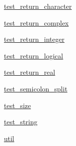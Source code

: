 \begin{DoxyCompactItemize}
 \hyperlink{namespacenumpy_1_1f2py_1_1tests_1_1test__return__character}{test\+\_\+return\+\_\+character}
\item 
 \hyperlink{namespacenumpy_1_1f2py_1_1tests_1_1test__return__complex}{test\+\_\+return\+\_\+complex}
\item 
 \hyperlink{namespacenumpy_1_1f2py_1_1tests_1_1test__return__integer}{test\+\_\+return\+\_\+integer}
\item 
 \hyperlink{namespacenumpy_1_1f2py_1_1tests_1_1test__return__logical}{test\+\_\+return\+\_\+logical}
\item 
 \hyperlink{namespacenumpy_1_1f2py_1_1tests_1_1test__return__real}{test\+\_\+return\+\_\+real}
\item 
 \hyperlink{namespacenumpy_1_1f2py_1_1tests_1_1test__semicolon__split}{test\+\_\+semicolon\+\_\+split}
\item 
 \hyperlink{namespacenumpy_1_1f2py_1_1tests_1_1test__size}{test\+\_\+size}
\item 
 \hyperlink{namespacenumpy_1_1f2py_1_1tests_1_1test__string}{test\+\_\+string}
\item 
 \hyperlink{namespacenumpy_1_1f2py_1_1tests_1_1util}{util}
\end{DoxyCompactItemize}
